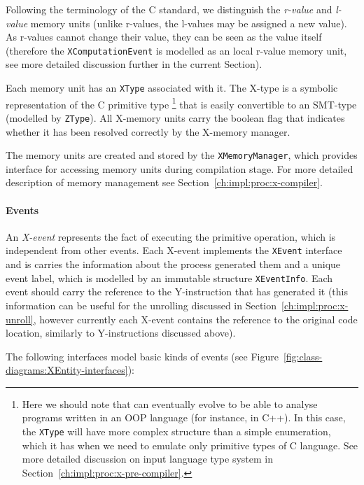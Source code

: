 Following the terminology of the C standard, we distinguish the \textit{r-value} and \textit{l-value} memory units (unlike r-values, the l-values may be assigned a new value).
As r-values cannot change their value, they can be seen as the value itself (therefore the \texttt{XComputationEvent} is modelled as an local r-value memory unit, see more detailed discussion further in the current Section).

Each memory unit has an \texttt{XType} associated with it.
The X-type is a symbolic representation of the C primitive type%
%
\footnote{Here we should note that \porthos[2] can eventually evolve to be able to analyse programs written in an OOP language (for instance, in C++). In this case, the \texttt{XType} will have more complex structure than a simple enumeration, which it has when we need to emulate only primitive types of C language. See more detailed discussion on input language type system in Section~\ref{ch:impl:proc:x-pre-compiler}.} %
%
that is easily convertible to an SMT-type (modelled by \texttt{ZType}). %
All X-memory units carry the boolean flag that indicates whether it has been resolved correctly by the X-memory manager.

The memory units are created and stored by the \texttt{XMemoryManager}, which provides interface for accessing memory units during compilation stage.
For more detailed description of memory management see Section~\ref{ch:impl:proc:x-compiler}.


\paragraph{Events}

An \textit{X-event} represents the fact of executing the primitive operation, which is independent from other events.
Each X-event implements the \texttt{XEvent} interface and is carries the information about the process generated them and a unique event label, which is modelled by an immutable structure \texttt{XEventInfo}.
Each event should carry the reference to the Y-instruction that has generated it (this information can be useful for the unrolling discussed in Section~\ref{ch:impl:proc:x-unroll}, however currently each X-event contains the reference to the original code location, similarly to Y-instructions discussed above).

The following interfaces model basic kinds of events (see Figure~\ref{fig:class-diagrams:XEntity-interfaces}):

